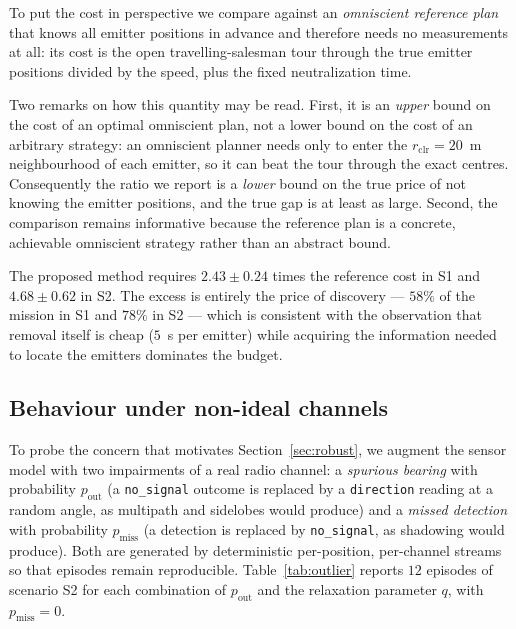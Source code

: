 \documentclass[journal,10pt]{IEEEtran}
\theoremstyle{definition}
\begin{document}
To put the cost in perspective we compare against an \emph{omniscient reference plan} that knows
all emitter positions in advance and therefore needs no measurements at all: its cost is the open
travelling-salesman tour through the true emitter positions divided by the speed, plus the fixed
neutralization time.

Two remarks on how this quantity may be read. First, it is an \emph{upper} bound on the cost of an
optimal omniscient plan, not a lower bound on the cost of an arbitrary strategy: an omniscient
planner needs only to enter the $r_{\mathrm{clr}}=20$~m neighbourhood of each emitter, so it can
beat the tour through the exact centres. Consequently the ratio we report is a \emph{lower} bound
on the true price of not knowing the emitter positions, and the true gap is at least as large.
Second, the comparison remains informative because the reference plan is a concrete, achievable
omniscient strategy rather than an abstract bound.

The proposed method requires $2.43\pm0.24$ times the reference cost in S1 and $4.68\pm0.62$ in S2. The excess is entirely the price
of discovery --- $58\%$ of the mission in S1 and $78\%$ in S2 --- which is consistent with the
observation that removal itself is cheap ($5$~s per emitter) while acquiring the information
needed to locate the emitters dominates the budget.


\subsection{Behaviour under non-ideal channels}
\label{sec:outlier}

To probe the concern that motivates Section~\ref{sec:robust}, we augment the sensor model with two
impairments of a real radio channel: a \emph{spurious bearing} with probability $p_{\mathrm{out}}$
(a \texttt{no\_signal} outcome is replaced by a \texttt{direction} reading at a random angle, as
multipath and sidelobes would produce) and a \emph{missed detection} with probability
$p_{\mathrm{miss}}$ (a detection is replaced by \texttt{no\_signal}, as shadowing would produce).
Both are generated by deterministic per-position, per-channel streams so that episodes remain
reproducible. Table~\ref{tab:outlier} reports $12$ episodes of scenario S2 for each combination of
$p_{\mathrm{out}}$ and the relaxation parameter $q$, with $p_{\mathrm{miss}}=0$.
\end{document}
